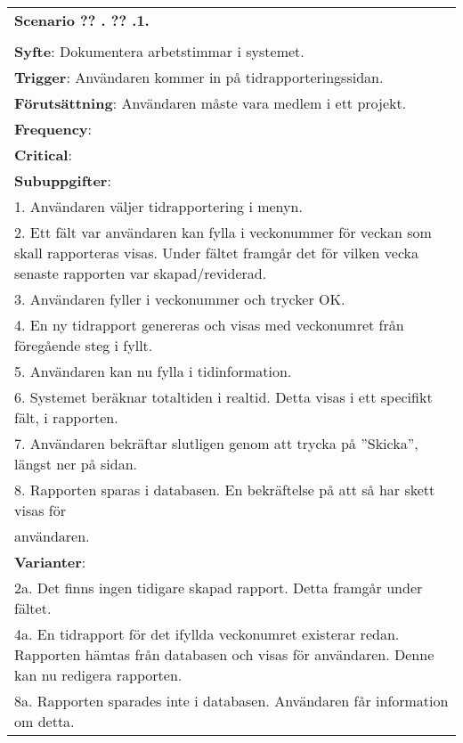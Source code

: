 \documentclass[a4paper]{article}
\newcommand\getcurrentref[1]{%
 \ifnumequal{\value{#1}}{0}
  {??}
  {\the\value{#1}}%
}
\newcommand\scenario[2] {
	\numberedrow{Scenario}{#1}{#2}
}
\newcommand\numberedrow[3]{
	\noindent
	\textbf{#1 \getcurrentref{section}.\getcurrentref{subsection}.#2.} #3
	
}
\begin{document}
\begin{table}[htbp]
\begin{tabular}{  | p{13cm} |}
    \hline
    
    \indent\scenario{1} \\ \\
    \textbf{Syfte}: Dokumentera arbetstimmar i systemet.\\
    \textbf{Trigger}: Användaren kommer in på tidrapporteringssidan. \\
    \textbf{Förutsättning}: Användaren måste vara medlem i ett projekt.\\
    \textbf{Frequency}: \\
    \textbf{Critical}: \\
    \hline



	\textbf{Subuppgifter}: \\

	1. Användaren väljer tidrapportering i menyn.\\
	2. Ett fält var användaren kan fylla i veckonummer för veckan som skall rapporteras 	visas. Under fältet framgår det för vilken vecka senaste rapporten var skapad/reviderad. \\	
	3. Användaren fyller i veckonummer och trycker OK. \\
	4. En ny tidrapport genereras och visas med veckonumret från föregående steg i fyllt. \\
	5. Användaren kan nu fylla i tidinformation. \\
	6. Systemet beräknar totaltiden i realtid. Detta visas i ett specifikt fält, i rapporten.\\
	7. Användaren bekräftar slutligen genom att trycka på ”Skicka”, längst ner på sidan.\\
	8. Rapporten sparas i databasen. En bekräftelse på att så har skett visas för\\ användaren.\\ \hline
    \textbf{Varianter}: \\
	2a. Det finns ingen tidigare skapad rapport. Detta framgår under fältet. \\
	4a. En tidrapport för det ifyllda veckonumret existerar redan. Rapporten hämtas från 		databasen och visas för användaren. Denne kan nu redigera rapporten. \\
	8a. Rapporten sparades inte i databasen. Användaren får information om detta.\\
    \hline
\end{tabular}
\end{table}
\end{document}
